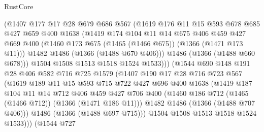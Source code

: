 \begin{lexlean}{RustCore}
\begin{coremodule}
                  (@1407
                    @177
                    @17
                    @28
                    @679
                    @686
                    @567
                    (@1619
                      @176
                      @11
                      @15
                      @593
                      @678
                      @685
                      @427
                      @659
                      @400
                      @1638
                      (@1419
                        @174
                        @104
                        @11
                        @14
                        @675
                        @406
                        @459
                        @427
                        @669
                        @400
                        (@1460 @173 @675 (@1465 (@1466 @675)) (@1366 (@1471 @173 @11)))
                        @1482
                        @1486
                        (@1366 (@1488 @670 @406)))
                      @1486
                      (@1366 (@1488 @660 @678)))
                    @1504
                    @1508
                    @1513
                    @1518
                    @1524
                    @1533)))
              (@1544
                @690
                @148
                @191
                @28
                @406
                @582
                @716
                @725
                @1579
                (@1407
                  @190
                  @17
                  @28
                  @716
                  @723
                  @567
                  (@1619
                    @189
                    @11
                    @15
                    @593
                    @715
                    @722
                    @427
                    @696
                    @400
                    @1638
                    (@1419
                      @187
                      @104
                      @11
                      @14
                      @712
                      @406
                      @459
                      @427
                      @706
                      @400
                      (@1460 @186 @712 (@1465 (@1466 @712)) (@1366 (@1471 @186 @11)))
                      @1482
                      @1486
                      (@1366 (@1488 @707 @406)))
                    @1486
                    (@1366 (@1488 @697 @715)))
                  @1504
                  @1508
                  @1513
                  @1518
                  @1524
                  @1533)))
            (@1544
              @727

\end{coremodule}
\end{lexlean}
